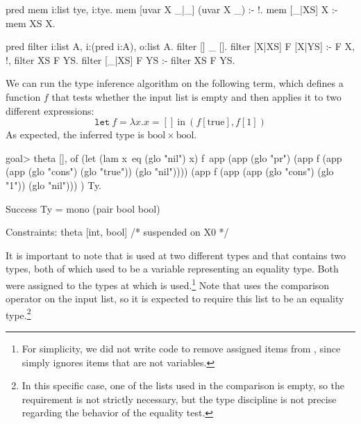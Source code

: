 \documentclass[a4paper, 11pt]{book}
\begin{document}
\begin{elpicode}
pred mem i:list tye, i:tye.
mem [uvar X _|_] (uvar X _) :- !.
mem [_|XS] X :- mem XS X.
 
pred filter i:list A, i:(pred i:A), o:list A.
filter [] _ [].
filter [X|XS] F [X|YS] :- F X, !, filter XS F YS.
filter [_|XS] F YS :- filter XS F YS.
\end{elpicode}

\noindent

We can run the type inference algorithm on the following term, which defines a
function $f$ that tests whether the input list is empty and then applies it to
two different expressions:
$$
\mathtt{let}\ f = \lambda x. x = []\ \mathrm{in}\ (f [\mathrm{true}], f [1])
$$
As expected, the inferred type is $\mathrm{bool} \times \mathrm{bool}$.
\begin{elpicode}
goal> theta [],
  of (let (lam x\ eq (glo "nil") x) f\
       app (app (glo "pr")
        (app f (app (app (glo "cons") (glo "true")) (glo "nil"))))
        (app f (app (app (glo "cons") (glo "1"))    (glo "nil")))
     ) Ty.

Success
  Ty = mono (pair bool bool)
 
Constraints:
  theta [int, bool]  /* suspended on X0 */
\end{elpicode}
It is important to note that  is used at two different types and that
\elpi{theta} contains two types, both of which used to be a variable representing an
equality type. Both were assigned to the types at which \elpi{f} is used.\footnote{
For simplicity, we did not write code to remove assigned items from
\elpi{theta}, since \elpi{bind} simply ignores items that are not variables.}
Note that \elpi{f} uses the comparison operator on the input list, so it is
expected to require this list to be an equality type.\footnote{In this specific
case, one of the lists used in the comparison is empty, so the requirement is
not strictly necessary, but the type discipline is not precise regarding the
behavior of the equality test.}
\end{document}
